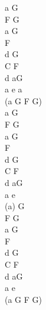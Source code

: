 \documentclass[a5paper, 10pt]{book}
\begin{document}
\begin{minipage}[t]{0.2\textwidth}
a  G\\
F  G\\
a  G\\
F  \\
d  G\\
C  F\\
d aG\\
a e a\\
(a G F G)\\

a  G\\
F  G\\
a  G\\
F  \\
d  G\\
C  F\\
d aG\\
a e\\ 

(a) G\\
F  G\\
a  G\\
F  \\
d  G\\
C  F\\
d aG\\
a e\\
(a G F G)\\

\end{minipage}

\newpage
\end{document}
